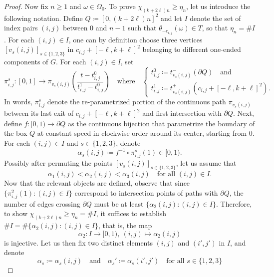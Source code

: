 \documentclass[a4paper, 11pt]{article} %
\theoremstyle{plain}
\newcommand{\1}{\mathds 1}
\numberwithin{equation}{section}
\begin{document}
\begin{proof}
    Now fix $n\geq 1$ and $\omega\in\Omega_0$. To prove $\chi_{(k+2\ell)n}\geq\eta_n$, let us introduce the following notation. Define $Q\coloneq[0,(k+2\ell)n]^2$ and let $I$ denote the set of index pairs $(i, j)$ between $0$ and $n-1$ such that $\theta_{-c_{i, j}}(\omega)\in T$, so that $\eta_n=\#I$. For each $(i, j)\in I$, one can by definition choose three vertices $[v_s(i, j)]_{s\in\{1,2,3\}}$ in $c_{i, j}+[-\ell, k+\ell]^2$ belonging to different one-ended components of $G$. For each $(i, j)\in I$, set
        \[\pi_{i, j}^{s}:[0,1]\to\pi_{v_s(i, j)}\left(\frac{t-t^0_{i, j}}{t^1_{i, j}-t^0_{i, j}}\right)\quad\text{where}\quad\begin{cases}
         t^0_{i, j}\coloneq t_{v_s(i, j)}^-(\partial Q)\quad\text{and}\\
        t^1_{i, j}\coloneq t_{v_s(i, j)}^+(c_{i, j}+[-\ell,k+\ell]^2).
        \end{cases}\]
    In words, $\pi_{i, j}^s$ denote the re-parametrized portion of the continuous path $\pi_{v_s(i, j)}$ between its last exit of $c_{i, j}+[-\ell,k+\ell]^2$ and first intersection with $\partial Q$. Next, define $f:[0,1)\to\partial Q$ as the continuous bijection that parametrize the boundary of the box $Q$ at constant speed in clockwise order around its center, starting from $0$. For each $(i,j)\in I$ and $s\in\{1,2,3\}$, denote
        \[\alpha_s(i, j)\coloneq f^{-1}\circ\pi_{i, j}^s(1)\in[0,1).\]
    Possibly after permuting the points $[v_s(i, j)]_{s\in\{1,2,3\}}$, let us assume that
        \[\alpha_1(i, j)<\alpha_2(i, j)<\alpha_3(i, j)\quad\text{for all $(i, j)\in I$}.\]
    Now that the relevant objects are defined, observe that since $\{\pi_{i, j}^2(1):(i, j)\in I\}$ correspond to intersection points of paths with $\partial Q$, the number of edges crossing $\partial Q$ must be at least $\{\alpha_2(i, j):(i, j)\in I\}$. Therefore, to show $\chi_{(k+2\ell)n}\geq\eta_n=\#I$, it suffices to establish $\#I=\#\{\alpha_2(i, j):(i, j)\in I\}$, that is, the map
        \[\alpha_2:I\to[0,1),~(i, j)\mapsto\alpha_2(i, j)\]
    is injective. Let us then fix two distinct elements $(i, j)$ and $(i', j')$ in $I$, and denote
        \[\alpha_s\coloneqq \alpha_s(i, j) \quad\text{and}\quad \alpha_s'\coloneqq \alpha_s(i', j') \quad\text{for all $s\in\{1,2,3\}$}\]

\end{proof}
\end{document}

